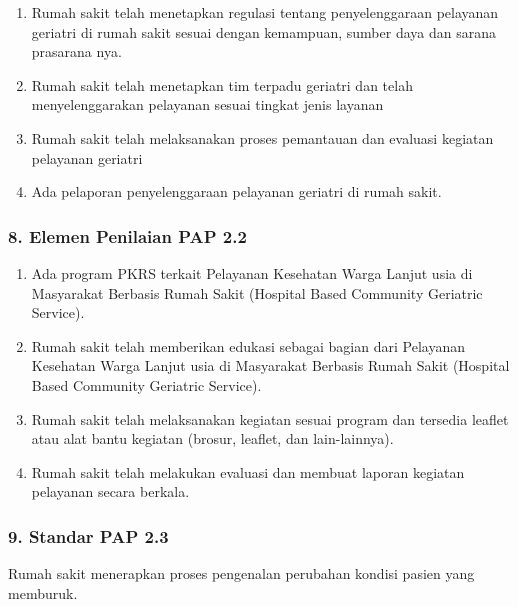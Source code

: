 \documentclass[
]{book}
\providecommand{\tightlist}{%
  \setlength{\itemsep}{0pt}\setlength{\parskip}{0pt}}
\begin{document}
\begin{enumerate}
\def\labelenumi{\alph{enumi}.}
\tightlist
\item
  Rumah sakit telah menetapkan regulasi tentang penyelenggaraan pelayanan geriatri di rumah sakit sesuai dengan kemampuan, sumber daya dan sarana prasarana nya.
\item
  Rumah sakit telah menetapkan tim terpadu geriatri dan telah menyelenggarakan pelayanan sesuai tingkat jenis layanan
\item
  Rumah sakit telah melaksanakan proses pemantauan dan evaluasi kegiatan pelayanan geriatri
\item
  Ada pelaporan penyelenggaraan pelayanan geriatri di rumah sakit.
\end{enumerate}

\hypertarget{elemen-penilaian-pap-2.2}{%
\subsubsection*{8. Elemen Penilaian PAP 2.2}\label{elemen-penilaian-pap-2.2}}

\begin{enumerate}
\def\labelenumi{\alph{enumi}.}
\tightlist
\item
  Ada program PKRS terkait Pelayanan Kesehatan Warga Lanjut usia di Masyarakat Berbasis Rumah Sakit (Hospital Based Community Geriatric Service).
\item
  Rumah sakit telah memberikan edukasi sebagai bagian dari Pelayanan Kesehatan Warga Lanjut usia di Masyarakat Berbasis Rumah Sakit (Hospital Based Community Geriatric Service).
\item
  Rumah sakit telah melaksanakan kegiatan sesuai program dan tersedia leaflet atau alat bantu kegiatan (brosur, leaflet, dan lain-lainnya).
\item
  Rumah sakit telah melakukan evaluasi dan membuat laporan kegiatan pelayanan secara berkala.
\end{enumerate}

\hypertarget{standar-pap-2.3}{%
\subsubsection*{9. Standar PAP 2.3}\label{standar-pap-2.3}}

Rumah sakit menerapkan proses pengenalan perubahan kondisi pasien yang memburuk.
\end{document}
